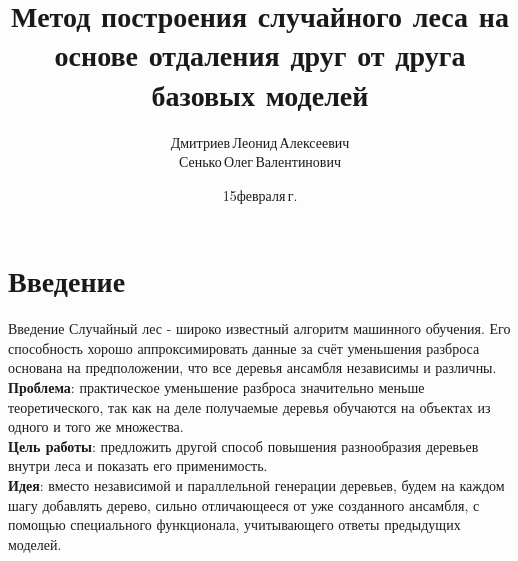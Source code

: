 \documentclass[10pt,pdf,hyperref={unicode}]{beamer}
\title[Метод построения случайного леса на основе отдаления друг от друга базовых моделей]{Метод построения случайного леса на основе отдаления друг от друга базовых моделей}
\author{Дмитриев\,Леонид\,Алексеевич\\Сенько\,Олег\,Валентинович}
\institute[]{Московский государственный университет им. М. В. Ломоносова}
\date[2023]{\small 15\;февраля\;2023\,г.}
\begin{document}
	
	\begin{frame}
		\titlepage
	\end{frame}
	
	\section{Введение}
	\begin{frame}{Введение}
		\bigskip
		Случайный лес - широко известный алгоритм машинного обучения. Его способность хорошо аппроксимировать данные за счёт уменьшения разброса основана на предположении, что все деревья ансамбля независимы и различны.\\
		\bigskip
		\textbf{Проблема}: практическое уменьшение разброса значительно меньше теоретического, так как на деле получаемые деревья обучаются на объектах из одного и того же множества.\\
		\bigskip
		\textbf{Цель работы}: предложить другой способ повышения разнообразия деревьев внутри леса и показать его применимость.\\
		\bigskip
		\textbf{Идея}: вместо независимой и параллельной генерации деревьев, будем на каждом шагу добавлять дерево, сильно отличающееся от уже созданного ансамбля, с помощью специального функционала, учитывающего ответы предыдущих моделей.
	\end{frame}
	
\end{document}
